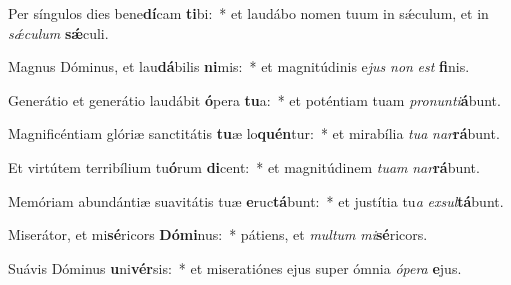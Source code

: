 \item Per síngulos dies bene\textbf{dí}cam \textbf{ti}bi:~* et laudábo nomen tuum in sǽculum, et in \textit{sǽ}\textit{cu}\textit{lum} \textbf{sǽ}culi.
\item Magnus Dóminus, et lau\textbf{dá}bilis \textbf{ni}mis:~* et magnitúdinis e\textit{jus} \textit{non} \textit{est} \textbf{fi}nis.
\item Generátio et generátio laudábit \textbf{ó}pera \textbf{tu}a:~* et poténtiam tuam \textit{pro}\textit{nun}\textit{ti}\textbf{á}bunt.
\item Magnificéntiam glóriæ sanctitátis \textbf{tu}æ lo\textbf{quén}tur:~* et mirabília \textit{tu}\textit{a} \textit{nar}\textbf{rá}bunt.
\item Et virtútem terribílium tu\textbf{ó}rum \textbf{di}cent:~* et magnitúdinem \textit{tu}\textit{am} \textit{nar}\textbf{rá}bunt.
\item Memóriam abundántiæ suavitátis tuæ \textbf{e}ruc\textbf{tá}bunt:~* et justítia tu\textit{a} \textit{ex}\textit{sul}\textbf{tá}bunt.
\item Miserátor, et mi\textbf{sé}ricors \textbf{Dó}\textbf{mi}nus:~* pátiens, et \textit{mul}\textit{tum} \textit{mi}\textbf{sé}ricors.
\item Suávis Dóminus \textbf{u}ni\textbf{vér}sis:~* et miseratiónes ejus super ómnia \textit{ó}\textit{pe}\textit{ra} \textbf{e}jus.
